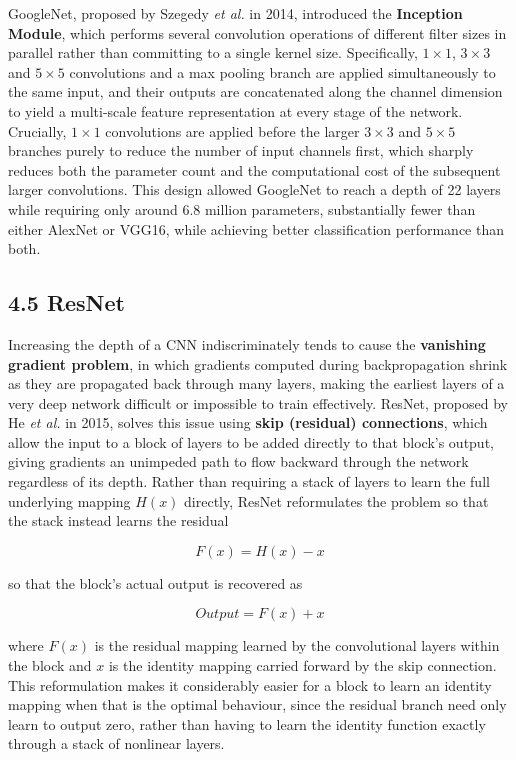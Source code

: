 \documentclass[11pt,a4paper]{article}
\begin{document}
GoogleNet, proposed by Szegedy \textit{et al.} in 2014, introduced the \textbf{Inception Module}, which performs several convolution operations of different filter sizes in parallel rather than committing to a single kernel size. Specifically, $1\times1$, $3\times3$ and $5\times5$ convolutions and a max pooling branch are applied simultaneously to the same input, and their outputs are concatenated along the channel dimension to yield a multi-scale feature representation at every stage of the network. Crucially, $1\times1$ convolutions are applied before the larger $3\times3$ and $5\times5$ branches purely to reduce the number of input channels first, which sharply reduces both the parameter count and the computational cost of the subsequent larger convolutions. This design allowed GoogleNet to reach a depth of 22 layers while requiring only around 6.8 million parameters, substantially fewer than either AlexNet or VGG16, while achieving better classification performance than both.

\subsection*{4.5 ResNet}

Increasing the depth of a CNN indiscriminately tends to cause the \textbf{vanishing gradient problem}, in which gradients computed during backpropagation shrink as they are propagated back through many layers, making the earliest layers of a very deep network difficult or impossible to train effectively. ResNet, proposed by He \textit{et al.} in 2015, solves this issue using \textbf{skip (residual) connections}, which allow the input to a block of layers to be added directly to that block's output, giving gradients an unimpeded path to flow backward through the network regardless of its depth. Rather than requiring a stack of layers to learn the full underlying mapping $H(x)$ directly, ResNet reformulates the problem so that the stack instead learns the residual

\[
F(x) = H(x) - x
\]

so that the block's actual output is recovered as

\[
Output = F(x) + x
\]

where $F(x)$ is the residual mapping learned by the convolutional layers within the block and $x$ is the identity mapping carried forward by the skip connection. This reformulation makes it considerably easier for a block to learn an identity mapping when that is the optimal behaviour, since the residual branch need only learn to output zero, rather than having to learn the identity function exactly through a stack of nonlinear layers.
\end{document}
